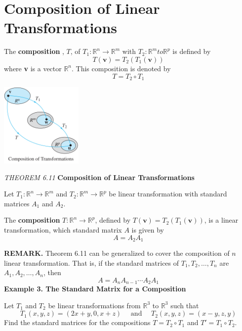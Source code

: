 \documentclass{article}
\newcommand\R{\mathbb{R}}
\begin{document}
    \section{Composition of Linear Transformations}

    \begin{minipage}{0.6\linewidth}
    The \textbf{composition} , $T$, of $T_1: \R^n  \to \R^m $ with $T_2: \R^m  to \R^p$ is defined by
    \[T( \textbf{v} ) = T_2(T_1( \textbf{v} )) \]    
    where \textbf{v} is a vector $ \R^n $. This composition is denoted by
    \[T = T_2 \circ T_1\]
    \end{minipage} \hfill
    \begin{minipage}{0.3\linewidth}
        \includegraphics[width = 4cm]{images/compos.png}
    \end{minipage}
    \begin{tcolorbox}[colback = {blue9}]
        \textit{THEOREM 6.11} \textbf{Composition of Linear Transformations}

        Let $T_1: \R^n  \to \R^m $ and $T_2: \R^m  \to \R^p$ be linear transformation with standard matrices $A_1$ and $A_2$.

        The \textbf{composition} $T: \R^n  \to \R^p$, defined by $T( \textbf{v}) = T_2(T_1( \textbf{v} ))$, is a linear transformation,
        which standard matrix $A$ is given by
        \[A = A_2A_1\]
    \end{tcolorbox}
    \textbf{REMARK.} Theorem 6.11 can be generalized to cover the composition of $n$ linear transformation. That is,
    if the standard matrices of     $T_1, T_2, \dots, T_n$ are $A_1, A_2, \dots, A_n$, then 
    \[A = A_nA_{n-1}\cdots A_2A_1\]
    \textbf{Example 3. \textcolor{blue5}{The Standard Matrix for a Composition}}

    Let $T_1$ and $T_2$ be linear transformations from $ \R^3 $ to $ \R^3 $ such that
    \[T_1(x,y,z) = (2x + y, 0 , x+z) \quad \text{ and  } \quad T_2(x,y,z) = (x - y, z, y)\]
    Find the standard matrices for the compositions $T = T_2 \circ T_1$ and $T' = T_1 \circ T_2$.
\end{document}
